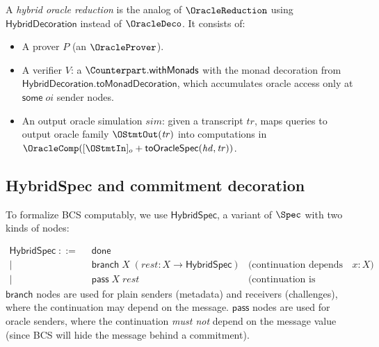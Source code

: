 \begin{definition}[HybridOracleReduction]
  \label{bcs:hybrid-oracle-reduction}
  A \emph{hybrid oracle reduction} is the analog of $\OracleReduction$ using
  $\mathsf{HybridDecoration}$ instead of $\OracleDeco$.
  It consists of:
  \begin{itemize}
    \item A prover $P$ (an $\OracleProver$).
    \item A verifier $V$: a $\Counterpart.\mathsf{withMonads}$ with
      the monad decoration from
      $\mathsf{HybridDecoration.toMonadDecoration}$, which accumulates
      oracle access only at $\mathsf{some}\;\mathit{oi}$ sender nodes.
    \item An output oracle simulation $\mathit{sim}$: given a transcript
      $\mathit{tr}$, maps queries to output oracle family
      $\OStmtOut(\mathit{tr})$ into computations in
      $\OracleComp([\OStmtIn]_o + \mathsf{toOracleSpec}(\mathit{hd},
      \mathit{tr}))$.
  \end{itemize}
\end{definition}

\subsection{HybridSpec and commitment decoration}

To formalize BCS computably, we use $\mathsf{HybridSpec}$, a variant of
$\Spec$ with two kinds of nodes:

\begin{definition}[HybridSpec]
  \label{bcs:hybrid-spec}
  \begin{align*}
    \mathsf{HybridSpec} \;::=\;
    &\;\mathsf{done} \\
    \mid\;&\;\mathsf{branch}\;X\;(\mathit{rest} : X \to \mathsf{HybridSpec})
      & \text{(continuation depends on } x : X \text{)} \\
    \mid\;&\;\mathsf{pass}\;X\;\mathit{rest}
      & \text{(continuation is structurally constant)}
  \end{align*}
  $\mathsf{branch}$ nodes are used for plain senders (metadata) and receivers
  (challenges), where the continuation may depend on the message.
  $\mathsf{pass}$ nodes are used for oracle senders, where the continuation
  \emph{must not} depend on the message value (since BCS will hide the
  message behind a commitment).
  \uses{}
\end{definition}

